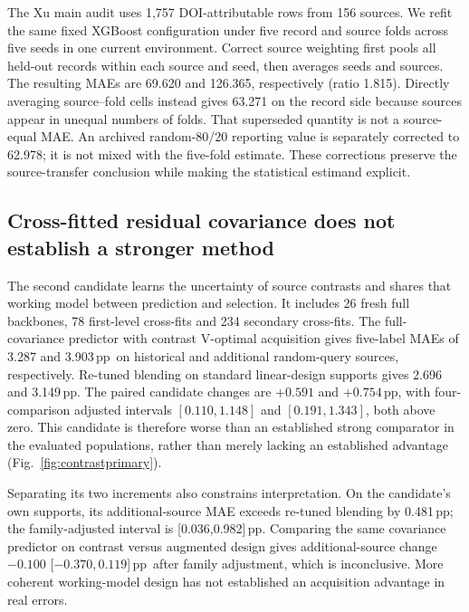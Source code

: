 \documentclass[11pt]{article}
\newcommand{\pp}{\,pp}
\begin{document}
The Xu main audit uses 1,757 DOI-attributable rows from 156 sources. We refit the same fixed XGBoost configuration under five record and source folds across five seeds in one current environment. Correct source weighting first pools all held-out records within each source and seed, then averages seeds and sources. The resulting MAEs are 69.620 and 126.365, respectively (ratio 1.815). Directly averaging source--fold cells instead gives 63.271 on the record side because sources appear in unequal numbers of folds. That superseded quantity is not a source-equal MAE. An archived random-80/20 reporting value is separately corrected to 62.978; it is not mixed with the five-fold estimate. These corrections preserve the source-transfer conclusion while making the statistical estimand explicit.

\subsection{Cross-fitted residual covariance does not establish a stronger method}
The second candidate learns the uncertainty of source contrasts and shares that working model between prediction and selection. It includes 26 fresh full backbones, 78 first-level cross-fits and 234 secondary cross-fits. The full-covariance predictor with contrast V-optimal acquisition gives five-label MAEs of 3.287 and 3.903\pp\ on historical and additional random-query sources, respectively. Re-tuned blending on standard linear-design supports gives 2.696 and 3.149\pp. The paired candidate changes are $+0.591$ and $+0.754$\pp, with four-comparison adjusted intervals $[0.110,1.148]$ and $[0.191,1.343]$, both above zero. This candidate is therefore worse than an established strong comparator in the evaluated populations, rather than merely lacking an established advantage (Fig.~\ref{fig:contrastprimary}).

\begin{table}[htbp]\centering\small
\caption{Five-label random-query MAE (pp). Source counts are 22 historical and 52 additional. The earlier frozen blend remains visible alongside more extensively re-tuned controls.}\label{tab:contrastperformance}
\end{table}

Separating its two increments also constrains interpretation. On the candidate's own supports, its additional-source MAE exceeds re-tuned blending by 0.481\pp; the family-adjusted interval is [0.036,0.982]\pp. Comparing the same covariance predictor on contrast versus augmented design gives additional-source change $-0.100$ [$-0.370,0.119$]\pp\ after family adjustment, which is inconclusive. More coherent working-model design has not established an acquisition advantage in real errors.
\end{document}
